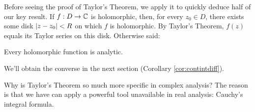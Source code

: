 \goodbreak

Before seeing the proof of Taylor's Theorem, we apply it to quickly deduce half of our key result.\smallbreak
If $f:D\to\mathbb{C}$ is holomorphic, then, for every $z_0\in D$, there exists some disk $\left| z-z_0\right|<R$ on which $f$ is holomorphic. By Taylor's Theorem, $f(z)$ equals its Taylor series on this disk. Otherwise said:

\begin{cor}{}{}
	Every holomorphic function is analytic.
\end{cor}

We'll obtain the converse in the next section (Corollary \ref{cor:contintdiff}).\bigbreak

Why is Taylor's Theorem so much more specific in complex analysis? The reason is that we have can apply a powerful tool unavailable in real analysis: Cauchy's integral formula.

